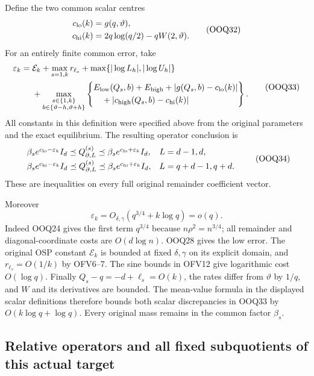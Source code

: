 \documentclass[11pt,a4paper]{article}
\begin{document}
Define the two common scalar centres
\[
\begin{split}
c_{\rm lo}(k)&=g(q,\vartheta),\\
c_{\rm hi}(k)&=2q\log(q/2)-qW(2,\vartheta).
\end{split}\tag{OOQ32}
\]
For an entirely finite common error, take
\[
\begin{split}
\varepsilon_k={}&\mathcal E_k+
 \max_{s=1,k}r_{\ell_s}+\max\{|\log L_h|,|\log U_h|\}\\
&+\max_{\substack{s\in\{1,k\}\\ b\in\{\vartheta-h,\vartheta+h\}}}
\left\{\begin{aligned}
 &E_{\rm low}(Q_s,b)+E_{\rm high}
   +|g(Q_s,b)-c_{\rm lo}(k)|\\
 &\quad+|c_{\rm high}(Q_s,b)-c_{\rm hi}(k)|
 \end{aligned}\right\}.
\end{split}\tag{OOQ33}
\]
All constants in this definition were specified above from
the original parameters and the exact equilibrium.
The resulting operator conclusion is
\[
\begin{array}{ll}
\beta_s e^{c_{\rm lo}-\varepsilon_k}I_d
\preceq Q_{\partial,L}^{(s)}
\preceq\beta_s e^{c_{\rm lo}+\varepsilon_k}I_d,
 &L=d-1,d,\\[3pt]
\beta_s e^{c_{\rm hi}-\varepsilon_k}I_d
\preceq Q_{\partial,L}^{(s)}
\preceq\beta_s e^{c_{\rm hi}+\varepsilon_k}I_d,
 &L=q+d-1,q+d .
\end{array}\tag{OOQ34}
\]
These are inequalities on every full original remainder
coefficient vector.

Moreover
\[
\varepsilon_k=O_{\delta,\gamma}(q^{3/4}+k\log q)=o(q).
\tag{OOQ35}
\]
Indeed OOQ24 gives the first term $q^{3/4}$ because
$n\rho^2=n^{3/4}$; all remainder and diagonal-coordinate
costs are $O(d\log n)$. OOQ28 gives the low error.
The original OSP constant $\mathcal E_k$ is bounded at fixed
$\delta,\gamma$ on its explicit domain, and
$r_{\ell_s}=O(1/k)$ by OFV6--7.
The sine bounds in OFV12 give logarithmic cost $O(\log q)$.
Finally $Q_s-q=-d+\ell_s=O(k)$, the rates differ from
$\vartheta$ by $1/q$, and $W$ and its derivatives are bounded.
The mean-value formula in the displayed scalar definitions
therefore bounds both scalar discrepancies in OOQ33 by
$O(k\log q+\log q)$.
Every original mass remains in the common factor $\beta_s$.

\subsection{Relative operators and all fixed subquotients of this actual target}
\end{document}
